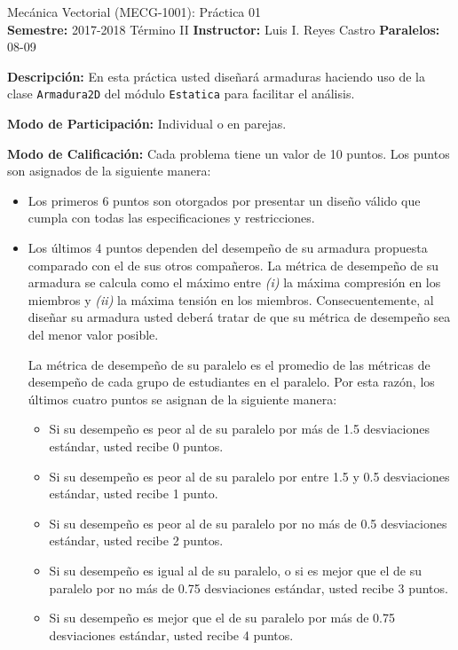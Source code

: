 \documentclass[ a4paper, twoside, 11pt]{article}
\newcommand{\numero}{01}
\begin{document}
\allowdisplaybreaks

\begin{center}
\Large Mec\'anica Vectorial (MECG-1001): Pr\'actica \numero \\[2ex]
\small \textbf{Semestre:} 2017-2018 T\'ermino II \qquad
\textbf{Instructor:} Luis I. Reyes Castro \qquad
\textbf{Paralelos:} 08-09
\end{center}
\fullskip

\textbf{Descripci\'on:} En esta pr\'actica usted dise\~nar\'a armaduras haciendo uso de la clase \texttt{Armadura2D} del m\'odulo \texttt{Estatica} para facilitar el an\'alisis. 
\halfskip

\textbf{Modo de Participaci\'on:} Individual o en parejas. 
\halfskip

\textbf{Modo de Calificaci\'on:} Cada problema tiene un valor de 10 puntos. Los puntos son asignados de la siguiente manera: 
\begin{itemize}
\item Los primeros 6 puntos son otorgados por presentar un dise\~no v\'alido que cumpla con todas las especificaciones y restricciones. 
\item Los \'ultimos 4 puntos dependen del desempe\~no de su armadura propuesta comparado con el de sus otros compa\~neros. La m\'etrica de desempe\~no de su armadura se calcula como el m\'aximo entre \textit{(i)} la m\'axima compresi\'on en los miembros y \textit{(ii)} la m\'axima tensi\'on en los miembros. Consecuentemente, al dise\~nar su armadura usted deber\'a tratar de que su m\'etrica de desempe\~no sea del menor valor posible. 

La m\'etrica de desempe\~no de su paralelo es el promedio de las m\'etricas de desempe\~no de cada grupo de estudiantes en el paralelo. Por esta raz\'on, los \'ultimos cuatro puntos se asignan de la siguiente manera: 
\begin{itemize}
\item Si su desempe\~no es peor al de su paralelo por m\'as de 1.5 desviaciones est\'andar, usted recibe 0 puntos. 
\item Si su desempe\~no es peor al de su paralelo por entre 1.5 y 0.5 desviaciones est\'andar, usted recibe 1 punto. 
\item Si su desempe\~no es peor al de su paralelo por no m\'as de 0.5 desviaciones est\'andar, usted recibe 2 puntos. 
\item Si su desempe\~no es igual al de su paralelo, o si es mejor que el de su paralelo por no m\'as de 0.75 desviaciones est\'andar, usted recibe 3 puntos. 
\item Si su desempe\~no es mejor que el de su paralelo por m\'as de 0.75 desviaciones est\'andar, usted recibe 4 puntos. 
\end{itemize}

\end{itemize}
\fullskip
\newpage
\end{document}
